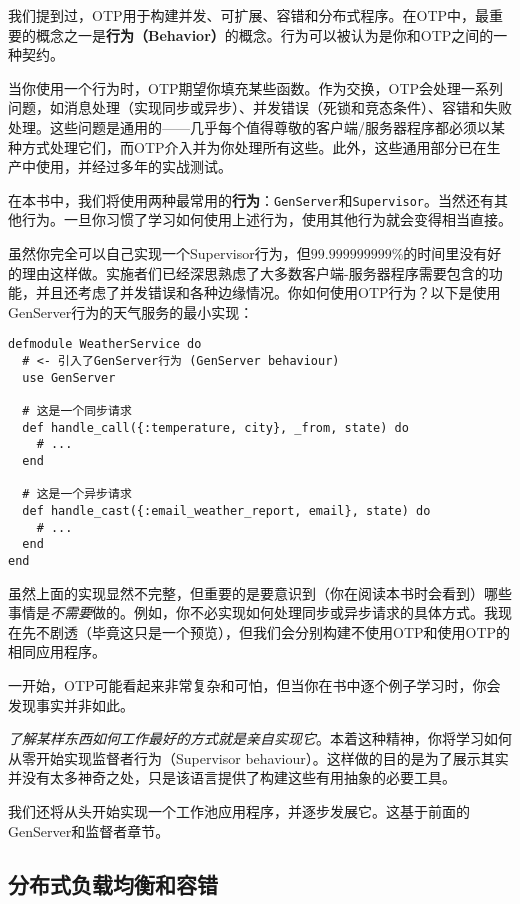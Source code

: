 我们提到过，OTP用于构建并发、可扩展、容错和分布式程序。在OTP中，最重要的概念之一是\textbf{行为（Behavior）}的概念。行为可以被认为是你和OTP之间的一种契约。

当你使用一个行为时，OTP期望你填充某些函数。作为交换，OTP会处理一系列问题，如消息处理（实现同步或异步）、并发错误（死锁和竞态条件）、容错和失败处理。这些问题是通用的------几乎每个值得尊敬的客户端/服务器程序都必须以某种方式处理它们，而OTP介入并为你处理所有这些。此外，这些通用部分已在生产中使用，并经过多年的实战测试。

在本书中，我们将使用两种最常用的\textbf{行为}：\texttt{GenServer}和\texttt{Supervisor}。当然还有其他行为。一旦你习惯了学习如何使用上述行为，使用其他行为就会变得相当直接。

虽然你完全可以自己实现一个Supervisor行为，但$99.999999999\%$的时间里没有好的理由这样做。实施者们已经深思熟虑了大多数客户端-服务器程序需要包含的功能，并且还考虑了并发错误和各种边缘情况。你如何使用OTP行为？以下是使用GenServer行为的天气服务的最小实现：

\begin{code}{}\begin{verbatim}
defmodule WeatherService do
  # <- 引入了GenServer行为 (GenServer behaviour)
  use GenServer

  # 这是一个同步请求
  def handle_call({:temperature, city}, _from, state) do
    # ...
  end

  # 这是一个异步请求
  def handle_cast({:email_weather_report, email}, state) do
    # ...
  end
end
\end{verbatim}
\end{code}

虽然上面的实现显然不完整，但重要的是要意识到（你在阅读本书时会看到）哪些事情是\emph{不需要}做的。例如，你不必实现如何处理同步或异步请求的具体方式。我现在先不剧透（毕竟这只是一个预览），但我们会分别构建不使用OTP和使用OTP的相同应用程序。

一开始，OTP可能看起来非常复杂和可怕，但当你在书中逐个例子学习时，你会发现事实并非如此。

\emph{了解某样东西如何工作最好的方式就是亲自实现它}。本着这种精神，你将学习如何从零开始实现监督者行为（Supervisor
behaviour）。这样做的目的是为了展示其实并没有太多神奇之处，只是该语言提供了构建这些有用抽象的必要工具。

我们还将从头开始实现一个工作池应用程序，并逐步发展它。这基于前面的GenServer和监督者章节。

\subsection{分布式负载均衡和容错}

